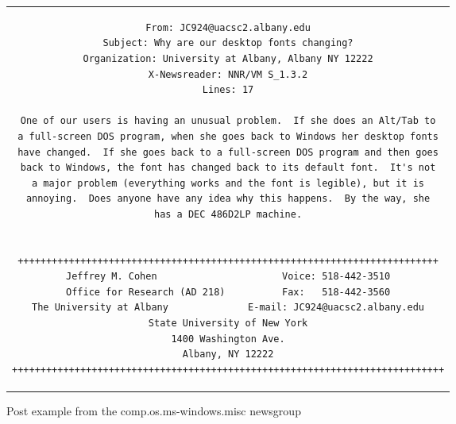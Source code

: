 \documentclass[sigconf]{acmart}
\begin{document}
\begin{figure}
	\begin{center}
		\begin{tabular}{c}
			\begin{lstlisting}[basicstyle=\footnotesize]
From: JC924@uacsc2.albany.edu
Subject: Why are our desktop fonts changing?
Organization: University at Albany, Albany NY 12222
X-Newsreader: NNR/VM S_1.3.2
Lines: 17

One of our users is having an unusual problem.  If she does an Alt/Tab to
a full-screen DOS program, when she goes back to Windows her desktop fonts
have changed.  If she goes back to a full-screen DOS program and then goes
back to Windows, the font has changed back to its default font.  It's not
a major problem (everything works and the font is legible), but it is
annoying.  Does anyone have any idea why this happens.  By the way, she
has a DEC 486D2LP machine.


++++++++++++++++++++++++++++++++++++++++++++++++++++++++++++++++++++++++++
Jeffrey M. Cohen                      Voice: 518-442-3510
Office for Research (AD 218)          Fax:   518-442-3560
The University at Albany              E-mail: JC924@uacsc2.albany.edu
State University of New York
1400 Washington Ave.
Albany, NY 12222
++++++++++++++++++++++++++++++++++++++++++++++++++++++++++++++++++++++++++++
			\end{lstlisting}
		\end{tabular}
	\end{center}
	\caption{Post example from the comp.os.ms-windows.misc newsgroup}
	\label{fig:post}
\end{figure}
\end{document}
